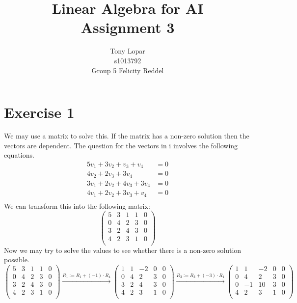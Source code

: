 \documentclass[a4paper]{article}
\title{Linear Algebra for AI\\Assignment 3}
\author{Tony Lopar \\ s1013792 \\ Group 5 \quad Felicity Reddel}
\begin{document}
\maketitle

\section*{Exercise 1}
We may use a matrix to solve this. If the matrix has a non-zero solution then the vectors are dependent. The question for the vectors in i involves the following equations.
\begin{align*}
  5v_1 +  3v_2 + v_3 + v_4 &= 0 \\
          4v_2 + 2v_3 + 3v_4 &= 0 \\
  3v_1 +  2v_2 + 4v_3 + 3v_4 &= 0 \\
  4v_1 +  2v_2 + 3v_3 + v_4 &= 0 \\
\end{align*}
We can transform this into the following matrix:
\[
\left(
\begin{array}{cccc|c}
5 & 3 & 1 & 1 & 0 \\
0 & 4 & 2 & 3 & 0 \\
3 & 2 & 4 & 3 & 0 \\
4 & 2 & 3 & 1 & 0 \\
\end{array}
\right)
\]
Now we may try to solve the values to see whether there is a non-zero solution possible.
\[
\left(
\begin{array}{cccc|c}
5 & 3 & 1 & 1 & 0 \\
0 & 4 & 2 & 3 & 0 \\
3 & 2 & 4 & 3 & 0 \\
4 & 2 & 3 & 1 & 0 \\
\end{array}
\right)
\xrightarrow{\text{$R_1 := R_1 + (-1) \cdot R_4$}}
\left(
\begin{array}{cccc|c}
1 & 1 & -2 & 0 & 0 \\
0 & 4 & 2 & 3 & 0 \\
3 & 2 & 4 & 3 & 0 \\
4 & 2 & 3 & 1 & 0 \\
\end{array}
\right)
\xrightarrow{\text{$R_3 := R_3 + (-3) \cdot R_1$}}
\left(
\begin{array}{cccc|c}
1 & 1 & -2 & 0 & 0 \\
0 & 4 & 2 & 3 & 0 \\
0 & -1 & 10 & 3 & 0 \\
4 & 2 & 3 & 1 & 0 \\
\end{array}
\right)
\]
\end{document}
